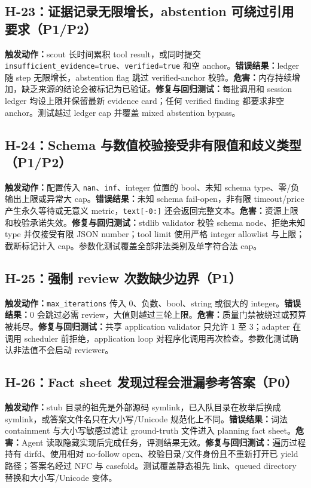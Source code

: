 \documentclass[11pt,a4paper,fontset=fandol]{ctexart}
\newcommand{\code}[1]{\texttt{#1}}
\begin{document}
\subsection{H-23：证据记录无限增长，abstention 可绕过引用要求（P1/P2）}

\textbf{触发动作：}scout 长时间累积 tool result，或同时提交 \code{insufficient\_evidence=true}、\code{verified=true} 和空 anchor。\textbf{错误结果：}ledger 随 step 无限增长，abstention flag 跳过 verified-anchor 校验。\textbf{危害：}内存持续增加，缺乏来源的结论会被标记为已验证。\textbf{修复与回归测试：}每批调用和 session ledger 均设上限并保留最新 evidence card；任何 verified finding 都要求非空 anchor。测试越过 ledger cap 并覆盖 mixed abstention bypass。

\subsection{H-24：Schema 与数值校验接受非有限值和歧义类型（P1/P2）}

\textbf{触发动作：}配置传入 \code{nan}、\code{inf}、integer 位置的 bool、未知 schema type、零/负输出上限或异常大 cap。\textbf{错误结果：}未知 schema fail-open，非有限 timeout/price 产生永久等待或无意义 metric，\code{text[-0:]} 还会返回完整文本。\textbf{危害：}资源上限和校验承诺失效。\textbf{修复与回归测试：}stdlib validator 校验 schema node、拒绝未知 type 并仅接受有限 JSON number；tool limit 使用严格 integer allowlist 与上限；截断标记计入 cap。参数化测试覆盖全部非法类别及单字符合法 cap。

\subsection{H-25：强制 review 次数缺少边界（P1）}

\textbf{触发动作：}\code{max\_iterations} 传入 0、负数、bool、string 或很大的 integer。\textbf{错误结果：}0 会跳过必需 review，大值则越过三轮上限。\textbf{危害：}质量门禁被绕过或预算被耗尽。\textbf{修复与回归测试：}共享 application validator 只允许 1 至 3；adapter 在调用 scheduler 前拒绝，application loop 对程序化调用再次检查。参数化测试确认非法值不会启动 reviewer。

\subsection{H-26：Fact sheet 发现过程会泄漏参考答案（P0）}

\textbf{触发动作：}stub 目录的祖先是外部源码 symlink，已入队目录在枚举后换成 symlink，或答案文件名只在大小写/Unicode 规范化上不同。\textbf{错误结果：}词法 containment 与大小写敏感过滤让 ground-truth 文件进入 planning fact sheet。\textbf{危害：}Agent 读取隐藏实现后完成任务，评测结果无效。\textbf{修复与回归测试：}遍历过程持有 dirfd、使用相对 no-follow open、校验目录/文件身份且不重新打开已 yield 路径；答案名经过 NFC 与 casefold。测试覆盖静态祖先 link、queued directory 替换和大小写/Unicode 变体。
\end{document}
